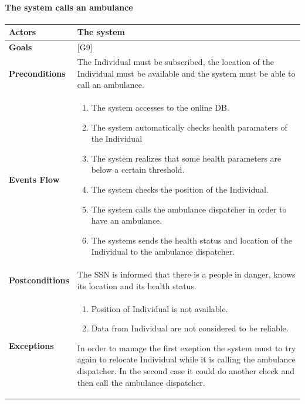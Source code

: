 \documentclass[12pt]{article}
\begin{document}
  
\newpage              
\paragraph{ The system calls an ambulance} 
\begin{center}
    \begin{tabular} { |p{}|p{}| }
         \hline
         \textbf{Actors} & The system \\ 
         \hline
         \textbf{Goals} & {[G9]} \\ 
         \hline  
         \textbf{Preconditions} & The Individual must be subscribed, the location of the Individual must be available and the system must be able to call an ambulance. \\ 
         \hline
         \textbf{Events Flow} & \begin{enumerate}[topsep=0pt]
             \setlength{\itemsep}{0.5pt}
             \item The system accesses to the online DB.
             \item The system automatically checks health paramaters of the Individual 
             \item The system realizes that some health parameters are below a certain threshold. 
             \item The system checks the position of the Individual. 
             \item The system calls the ambulance dispatcher in order to have an ambulance. 
             \item The systems sends the health status and location of the Individual to the ambulance dispatcher. 
             \end{enumerate} \\ 
        \hline 
        \textbf{Postconditions} & The SSN is informed that there is a people in danger, knows its location and its health status. \\ 
        \hline
         \textbf{Exceptions} & \begin{enumerate}[topsep=0pt] 
              \setlength{\itemsep}{0.5pt}
              \item Position of Individual is not available. 
              \item Data from Individual are not considered to be reliable. 
              \end{enumerate}
            In order to manage the first exeption the system must to try again to relocate Individual while it is calling the ambulance dispatcher. In the second case it could do another check and then call the ambulance dispatcher. \\
             \hline
    \end{tabular}
\end{center}
\end{document}
